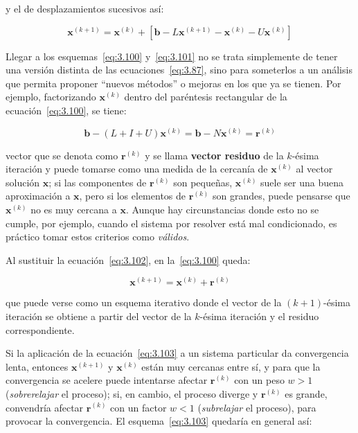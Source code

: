 \documentclass[12pt,letterpaper]{article}
\theoremstyle{definition}
\theoremstyle{plain}
\theoremstyle{remark}
\begin{document}
y el de desplazamientos sucesivos así:

\begin{equation}
\mathbf{x}^{(k+1)} = \mathbf{x}^{(k)} + \left[\mathbf{b} - L \mathbf{x}^{(k+1)} - \mathbf{x}^{(k)} - U \mathbf{x}^{(k)} \right]
\label{eq:3.101}
\tag{21}
\end{equation}

Llegar a los esquemas~\eqref{eq:3.100} y~\eqref{eq:3.101} no se trata simplemente de tener una versión distinta de las ecuaciones~\eqref{eq:3.87}, sino para someterlos a un análisis que permita proponer “nuevos métodos” o mejoras en los que ya se tienen. Por ejemplo, factorizando $\mathbf{x}^{(k)}$ dentro del paréntesis rectangular de la ecuación~\eqref{eq:3.100}, se tiene:

\begin{equation}
\mathbf{b} - (L + I + U)\mathbf{x}^{(k)} = \mathbf{b} - N \mathbf{x}^{(k)} = \mathbf{r}^{(k)}
\label{eq:3.102}
\tag{22}
\end{equation}

vector que se denota como $\mathbf{r}^{(k)}$ y se llama \textbf{vector residuo} de la $k$-ésima iteración y puede tomarse como una medida de la cercanía de $\mathbf{x}^{(k)}$ al vector solución $\mathbf{x}$; si las componentes de $\mathbf{r}^{(k)}$ son pequeñas, $\mathbf{x}^{(k)}$ suele ser una buena aproximación a $\mathbf{x}$, pero si los elementos de $\mathbf{r}^{(k)}$ son grandes, puede pensarse que $\mathbf{x}^{(k)}$ no es muy cercana a $\mathbf{x}$. Aunque hay circunstancias donde esto no se cumple, por ejemplo, cuando el sistema por resolver está mal condicionado, es práctico tomar estos criterios como \textit{válidos}.

Al sustituir la ecuación~\eqref{eq:3.102}, en la~\eqref{eq:3.100} queda:

\begin{equation}
\mathbf{x}^{(k+1)} = \mathbf{x}^{(k)} + \mathbf{r}^{(k)}
\label{eq:3.103}
\tag{23}
\end{equation}

que puede verse como un esquema iterativo donde el vector de la $(k+1)$-ésima iteración se obtiene a partir del vector de la $k$-ésima iteración y el residuo correspondiente.

Si la aplicación de la ecuación~\eqref{eq:3.103} a un sistema particular da convergencia lenta, entonces $\mathbf{x}^{(k+1)}$ y $\mathbf{x}^{(k)}$ están muy cercanas entre sí, y para que la convergencia se acelere puede intentarse afectar $\mathbf{r}^{(k)}$ con un peso $w > 1$ (\textit{sobrerelajar} el proceso); si, en cambio, el proceso diverge y $\mathbf{r}^{(k)}$ es grande, convendría afectar $\mathbf{r}^{(k)}$ con un factor $w < 1$ (\textit{subrelajar} el proceso), para provocar la convergencia. El esquema~\eqref{eq:3.103} quedaría en general así:
\end{document}
